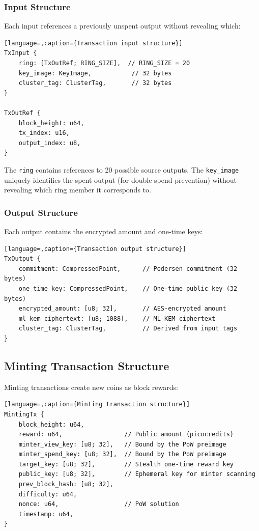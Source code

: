 \subsubsection{Input Structure}

Each input references a previously unspent output without revealing which:

\begin{lstlisting}[language=,caption={Transaction input structure}]
TxInput {
    ring: [TxOutRef; RING_SIZE],  // RING_SIZE = 20
    key_image: KeyImage,           // 32 bytes
    cluster_tag: ClusterTag,       // 32 bytes
}

TxOutRef {
    block_height: u64,
    tx_index: u16,
    output_index: u8,
}
\end{lstlisting}

The \texttt{ring} contains references to 20 possible source outputs.
The \texttt{key\_image} uniquely identifies the spent output (for
double-spend prevention) without revealing which ring member it
corresponds to.

\subsubsection{Output Structure}

Each output contains the encrypted amount and one-time keys:

\begin{lstlisting}[language=,caption={Transaction output structure}]
TxOutput {
    commitment: CompressedPoint,      // Pedersen commitment (32 bytes)
    one_time_key: CompressedPoint,    // One-time public key (32 bytes)
    encrypted_amount: [u8; 32],       // AES-encrypted amount
    ml_kem_ciphertext: [u8; 1088],    // ML-KEM ciphertext
    cluster_tag: ClusterTag,          // Derived from input tags
}
\end{lstlisting}

\subsection{Minting Transaction Structure}

Minting transactions create new coins as block rewards:

\begin{lstlisting}[language=,caption={Minting transaction structure}]
MintingTx {
    block_height: u64,
    reward: u64,                 // Public amount (picocredits)
    minter_view_key: [u8; 32],   // Bound by the PoW preimage
    minter_spend_key: [u8; 32],  // Bound by the PoW preimage
    target_key: [u8; 32],        // Stealth one-time reward key
    public_key: [u8; 32],        // Ephemeral key for minter scanning
    prev_block_hash: [u8; 32],
    difficulty: u64,
    nonce: u64,                  // PoW solution
    timestamp: u64,
}
\end{lstlisting}

